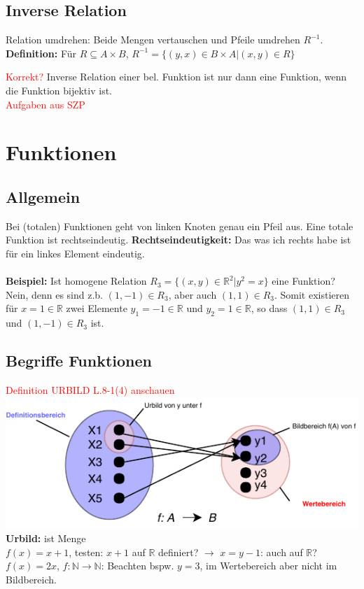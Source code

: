 \documentclass[8pt,landscape]{scrartcl}
\begin{document}
\begin{multicols}{3}
\subsection{Inverse Relation}
Relation umdrehen: Beide Mengen vertauschen und Pfeile umdrehen $R^{-1}$.\\
\textbf{Definition:} F\"ur $R \subseteq A \times B$, $R^{-1} = \{ (y, x) \in B \times A | (x, y) \in R \}$

\textcolor{red}{Korrekt?} Inverse Relation einer bel. Funktion ist nur dann eine Funktion, wenn die Funktion bijektiv ist.\\
\textcolor{red}{Aufgaben aus SZP}



\section{Funktionen}

\subsection{Allgemein}
Bei (totalen) Funktionen geht von linken Knoten genau ein Pfeil aus.
Eine totale Funktion ist rechtseindeutig.
\textbf{Rechtseindeutigkeit:} Das was ich rechts habe ist für ein linkes Element eindeutig.\\\\
\textbf{Beispiel:} Ist homogene Relation $R_3 = \{ (x, y) \in \mathbb{R}^2 | y^2 = x \}$ eine Funktion?\\
Nein, denn es sind z.b. $(1, -1) \in R_3$, aber auch $(1, 1) \in R_3$.
Somit existieren f\"ur $x=1 \in \mathbb{R}$ zwei Elemente $y_1 = -1 \in \mathbb{R}$ und $y_2 = 1 \in \mathbb{R}$, so dass $(1, 1) \in R_3$ und $(1, -1) \in R_3$ ist.

\subsection{Begriffe Funktionen}
\textcolor{red}{Definition URBILD L.8-1(4) anschauen}\\
\includegraphics[width=0.95\linewidth]{./begriffe_funktionen.pdf}\\
\textbf{Urbild:} ist Menge\\
$f(x) = x + 1$, testen: $x+1$ auf $\mathbb{R}$ definiert? $\rightarrow$ $x=y-1$: auch auf $\mathbb{R}$?\\
$f(x) = 2x$, $f: \mathbb{N} \rightarrow \mathbb{N}$: Beachten bspw. $y=3$, im Wertebereich aber nicht im Bildbereich.




\end{multicols}
\end{document}
